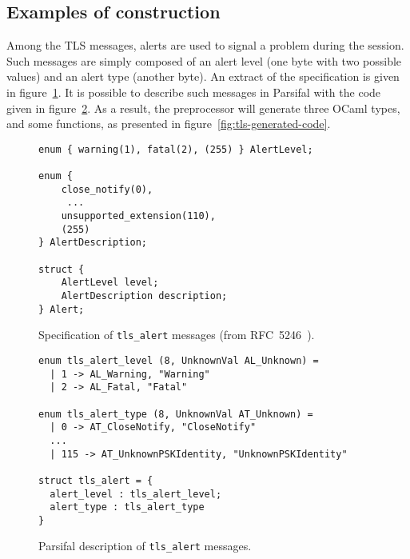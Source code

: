 \documentclass{article}
\begin{document}
\subsection{Examples of construction}

Among the TLS messages, alerts are used to signal a problem during the
session. Such messages are simply composed of an alert level (one byte
with two possible values) and an alert type (another byte). An extract
of the specification is given in figure~\ref{fig:tls-spec}. It is
possible to describe such messages in Parsifal with the code given in
figure~\ref{fig:tls-descr}. As a result, the preprocessor will
generate three OCaml types, and some functions, as presented in
figure~\ref{fig:tls-generated-code}.


\begin{figure}[p]
  \begin{center}\begin{minipage}{.35\linewidth}
    {\scriptsize
    \begin{verbatim}
enum { warning(1), fatal(2), (255) } AlertLevel;

enum {
    close_notify(0),
     ...
    unsupported_extension(110),
    (255)
} AlertDescription;

struct {
    AlertLevel level;
    AlertDescription description;
} Alert;
    \end{verbatim}}
  \end{minipage}\end{center}
  \caption{Specification of \texttt{tls\_alert} messages (from RFC~5246~\cite{rfc5246}).}
  \label{fig:tls-spec}
\end{figure}



\begin{figure}[p]
  \begin{center}\begin{minipage}{.56\linewidth}
    \begin{lstlisting}
enum tls_alert_level (8, UnknownVal AL_Unknown) =
  | 1 -> AL_Warning, "Warning"
  | 2 -> AL_Fatal, "Fatal"

enum tls_alert_type (8, UnknownVal AT_Unknown) =
  | 0 -> AT_CloseNotify, "CloseNotify"
  ...
  | 115 -> AT_UnknownPSKIdentity, "UnknownPSKIdentity"

struct tls_alert = {
  alert_level : tls_alert_level;
  alert_type : tls_alert_type
}
    \end{lstlisting}
  \end{minipage}\end{center}
  \caption{Parsifal description of \texttt{tls\_alert} messages.}
  \label{fig:tls-descr}
\end{figure}
\end{document}
